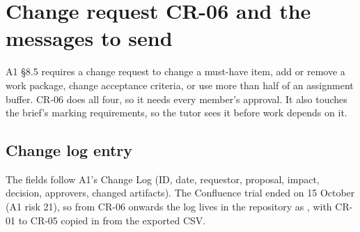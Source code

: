 \section{Change request CR-06 and the messages to send}
\label{app:cr06}

A1 §8.5 requires a change request to change a must-have item, add or remove a work package,
change acceptance criteria, or use more than half of an assignment buffer. CR-06 does all four,
so it needs every member's approval. It also touches the brief's marking requirements, so the
tutor sees it before work depends on it.

\subsection{Change log entry}

The fields follow A1's Change Log (ID, date, requestor, proposal, impact, decision, approvers,
changed artifacts). The Confluence trial ended on 15 October (A1 risk 21), so from CR-06 onwards
the log lives in the repository as , with CR-01 to CR-05 copied in from
the exported CSV.

